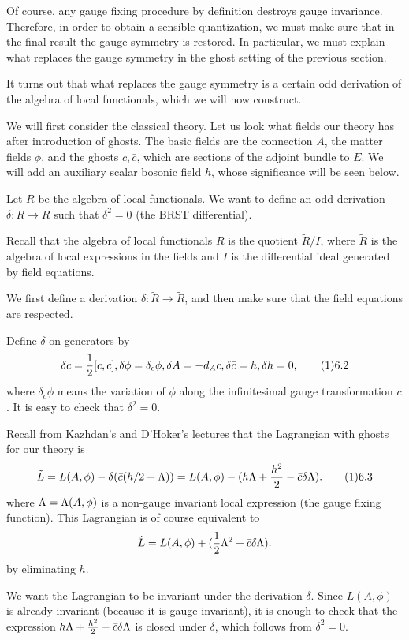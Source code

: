 Of course, any gauge fixing procedure by definition destroys gauge 
invariance. Therefore, in order to obtain a sensible quantization, we must
make sure that in the final result the gauge symmetry is restored. 
In particular, we must explain what replaces the gauge symmetry 
in the ghost setting of the previous section. 

It turns out that what replaces the gauge symmetry is a certain 
odd derivation of the algebra of local functionals, which 
we will now construct. 

We will first consider the classical theory. 
Let us look what fields our theory has after introduction 
of ghosts. The basic fields are the connection $A$, 
the matter fields $\phi$, 
and the ghosts $c,\bar c$, which are sections of the adjoint bundle to $E$.
We will add an auxiliary scalar bosonic field $h$, whose significance will be 
seen below. 
 
Let $R$ be the algebra of local functionals. 
We want to define an odd derivation 
$\delta:R\to R$ such that $\delta^2=0$
(the BRST differential). 

Recall that the algebra of local functionals $R$ 
is the quotient $\tilde R/I$, where $\tilde R$ 
is the algebra of local expressions in the fields and $I$ is the 
differential ideal generated by field equations.

We first define a derivation $\delta:\tilde R\to\tilde R$,  
and then make sure that the field equations are respected. 

Define $\delta$ on generators by 
$$
\delta c=\frac{1}{2}[c,c], \delta\phi=\delta_c\phi, \delta A=-d_Ac,
\delta\bar c=h,\delta h=0,\tag 16.2
$$
where $\delta_c\phi$ means the variation of $\phi$ along the infinitesimal 
gauge transformation $c$. It is easy to check that $\delta^2=0$. 

Recall from Kazhdan's and D'Hoker's lectures
that the Lagrangian with ghosts for our theory is
$$
\tilde L=L(A,\phi)-
\delta (\bar c(h/2 +\Lambda))=
L(A,\phi)-
(h\L+\frac{h^2}{2}-\bar c\delta\L).\tag 16.3
$$
where $\Lambda=\Lambda(A,\phi)$ is a non-gauge invariant local expression 
(the gauge fixing function).
This Lagrangian is of course equivalent to 
$$
\hat L=L(A,\phi)+(\frac{1}{2}\Lambda^2+\bar c\delta\Lambda).
$$
by eliminating $h$. 

We want the Lagrangian to be invariant
under the derivation $\delta$. Since $L(A,\phi)$ is 
already invariant (because it is gauge invariant), 
it is enough to check that the expression 
$h\Lambda+\frac{h^2}{2}-\bar c\delta\Lambda$ is closed under $\delta$, 
which follows from $\delta^2=0$. 

